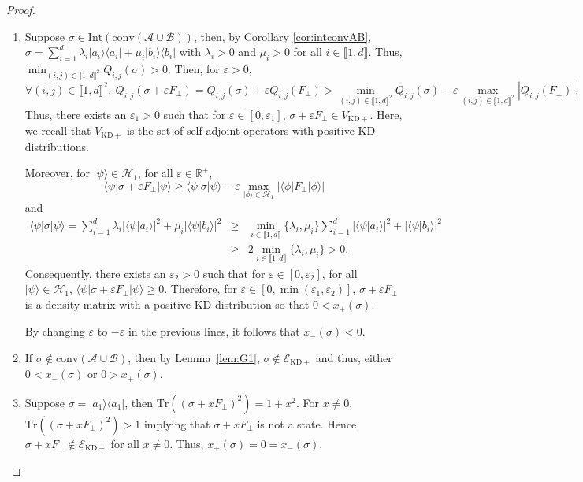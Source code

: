 \documentclass[a4paper, notitlepage, 11pt]{article}
\numberwithin{equation}{section}
\newcommand{\bra}[1]{\langle #1|}
\newcommand{\cket}[1]{|#1\rangle}
\newcommand{\bracket}[2]{\langle #1|#2\rangle}
\newcommand{\Acal}{{\mathcal A}}
\newcommand{\Bcal}{{\mathcal B}}
\newcommand{\EcalKDC}{{\mathcal E}_{\mathrm{KD+}}}
\newcommand{\R}{\mathbb{R}}
\newcommand{\conv}[1]{\mathrm{conv}\left(#1\right)}
\newcommand{\VRp}{V_{\mathrm{KD+}}}
\renewcommand{\H}{\mathcal{H}}
\newcommand{\IntEnt}[2]{\llbracket #1 , #2 \rrbracket}
\newcommand{\convAB}{\conv{\Acal \cup \Bcal}}
\renewcommand{\epsilon}{\varepsilon}
\begin{document}
\begin{proof}
\begin{enumerate}[label=(\roman*),wide, labelindent=0pt]
 \item Suppose $\sigma\in \mathrm{Int}(\convAB)$, then, by Corollary \ref{cor:intconvAB}, $\sigma = \sum_{i=1}^{d} \lambda_{i}\cket{a_i}\bra{a_i} +  \mu_{i}\cket{b_i}\bra{b_i}$ with $\lambda_i > 0$ and $\mu_i >0$ for all $i\in\IntEnt{1}{d}$. Thus, $\min_{(i,j)\in\IntEnt{1}{d}^2} Q_{i,j}(\sigma) > 0$. Then, for $\epsilon > 0$,
\[
\forall (i,j)\in\IntEnt{1}{d}^2, \ Q_{i,j}(\sigma+\epsilon F_{\perp}) = Q_{i,j}(\sigma) + \epsilon Q_{i,j}(F_{\perp}) >  \min_{(i,j)\in\IntEnt{1}{d}^2} Q_{i,j}(\sigma) - \epsilon \max_{(i,j)\in\IntEnt{1}{d}^2} \left|Q_{i,j}(F_{\perp})\right|.
\]
Thus, there exists an $\epsilon_1 > 0$ such that for $\epsilon\in [0,\epsilon_1]$, $\sigma+\epsilon F_{\perp}\in \VRp$. Here, we recall that $\VRp$ is the set of self-adjoint operators with positive KD distributions. 

Moreover, for $\cket{\psi}\in\H_{1}$, for all $\epsilon \in \R^{+}$,
\[
\bra{\psi}\sigma + \epsilon F_{\perp}\cket{\psi} \geqslant \bra{\psi}\sigma\cket{\psi} - 
\epsilon \max_{\cket{\phi}\in\H_{1}}\left|\bra{\phi} F_{\perp}\cket{\phi}\right|\]
and
\[
\begin{array}{rcl}
\bra{\psi}\sigma\cket{\psi} = \sum_{i=1}^{d} \lambda_{i}\left|\bracket{\psi}{a_i}\right|^2 +  \mu_{i}\left|\bracket{\psi}{b_i}\right|^2 &\geqslant& \min_{i\in \IntEnt{1}{d}} \{\lambda_i,\mu_i\} \sum_{i=1}^{d} \left|\bracket{\psi}{a_i}\right|^2 +  \left|\bracket{\psi}{b_i}\right|^2 \\
&\geqslant& 2\min_{i\in \IntEnt{1}{d}} \{\lambda_i,\mu_i\} > 0.
\end{array}
\]
Consequently, there exists an $\epsilon_2 > 0$ such that for $\epsilon \in [0,\epsilon_2]$, for all $\cket{\psi}\in\H_{1}$, $\bra{\psi}\sigma + \epsilon F_{\perp}\cket{\psi} \geqslant 0$.
Therefore, for $\epsilon\in [0,\min(\epsilon_1,\epsilon_2)]$, $\sigma+\epsilon F_{\perp}$ is a density matrix with a positive KD distribution so that $0 < x_{+}(\sigma) $.

By changing $\epsilon$ to $-\epsilon$ in the previous lines, it follows that $x_{-}(\sigma)<0$. 
\item If $\sigma \notin \convAB$, then by Lemma~\ref{lem:G1}, $\sigma \notin \EcalKDC$ and thus, either $0 < x_{-}(\sigma)$ or $0 > x_{+}(\sigma)$.

\item Suppose $\sigma=\cket{a_1}\bra{a_1}$, then $\mathrm{Tr}((\sigma + xF_{\perp})^2) = 1+x^2$. For $x \neq 0$, $\mathrm{Tr}((\sigma + xF_{\perp})^2) > 1$ implying that $\sigma + xF_{\perp}$ is not a state. Hence, $\sigma + x F_{\perp}\notin \EcalKDC$ for all $x\neq 0$. Thus, $x_{+}(\sigma)=0=x_{-}(\sigma)$.


\end{enumerate}
\end{proof}
\end{document}
